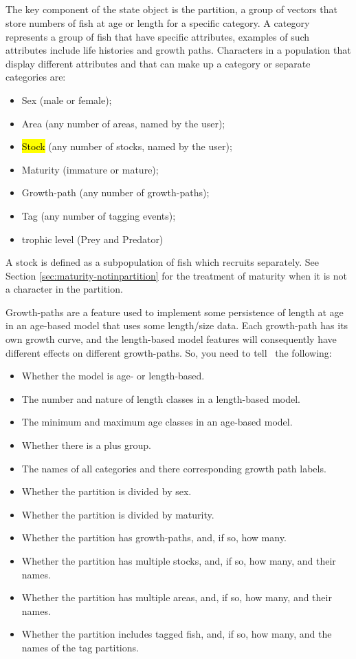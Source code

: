 \subsection{}

The key component of the state object is the partition, a group of vectors that store numbers of fish at age or length for a specific category. A category represents a group of fish that have specific attributes, examples of such attributes include life histories and growth paths. Characters in a population that display different attributes and that can make up a category or separate categories are:

\begin{itemize}
\item Sex (male or female);
\item Area (any number of areas, named by the user);
\item \hl{Stock} (any number of stocks, named by the user);
\item Maturity (immature or mature);
\item Growth-path (any number of growth-paths);
\item Tag (any number of tagging events);
\item trophic level (Prey and Predator)
\end{itemize}

A stock is defined as a subpopulation of fish which recruits separately. See Section \ref{sec:maturity-notinpartition} for the treatment of maturity when it is not a character in the partition. 

Growth-paths are a feature used to implement some persistence of length at age in an age-based model that uses some length/size data. Each growth-path has its own growth curve, and the length-based model features will consequently have different effects on different growth-paths. So, you need to tell \CNAME\ the following: 

\begin{itemize}
\item Whether the model is age- or length-based.
\item The number and nature of length classes in a length-based model.
\item	The minimum and maximum age classes in an age-based model.
\item	Whether there is a plus group.
\item 	The names of all categories and there corresponding growth path labels.
\item	Whether the partition is divided by sex.
\item	Whether the partition is divided by maturity.
\item	Whether the partition has growth-paths, and, if so, how many.
\item	Whether the partition has multiple stocks, and, if so, how many, and their names.
\item	Whether the partition has multiple areas, and, if so, how many, and their names.
\item	Whether the partition includes tagged fish, and, if so, how many, and the names of the tag partitions.
\end{itemize}

